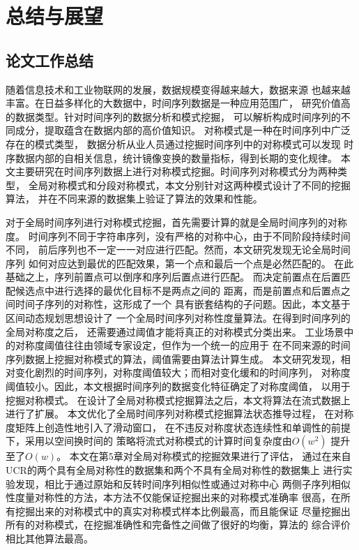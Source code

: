 
\chapter{总结与展望}
\section{论文工作总结}
随着信息技术和工业物联网的发展，数据规模变得越来越大，数据来源
也越来越丰富。在日益多样化的大数据中，时间序列数据是一种应用范围广，
研究价值高的数据类型。针对时间序列的数据分析和模式挖掘，
可以解析构成时间序列的不同成分，提取蕴含在数据内部的高价值知识。
对称模式是一种在时间序列中广泛存在的模式类型，
数据分析从业人员通过挖掘时间序列中的对称模式可以发现
时序数据内部的自相关信息，统计镜像变换的数量指标，得到长期的变化规律。
本文主要研究在时间序列数据上进行对称模式挖掘。时间序列对称模式分为两种类型，
全局对称模式和分段对称模式，本文分别针对这两种模式设计了不同的挖掘算法，
并在不同来源的数据集上验证了算法的效果和性能。

对于全局时间序列进行对称模式挖掘，首先需要计算的就是全局时间序列的对称度。
时间序列不同于字符串序列，没有严格的对称中心，由于不同阶段持续时间不同，
前后序列也不一定一一对应进行匹配。然而，本文研究发现无论全局时间序列
如何对应达到最优的匹配效果，第一个点和最后一个点是必然匹配的。
在此基础之上，序列前置点可以倒序和序列后置点进行匹配。
而决定前置点在后置匹配候选点中进行选择的最优化目标不是两点之间的
距离，而是前置点和后置点之间时间子序列的对称性，这形成了一个
具有嵌套结构的子问题。因此，本文基于区间动态规划思想设计了
一个全局时间序列对称性度量算法。在得到时间序列的全局对称度之后，
还需要通过阈值才能将真正的对称模式分类出来。
工业场景中的对称度阈值往往由领域专家设定，但作为一个统一的应用于
在不同来源的时间序列数据上挖掘对称模式的算法，阈值需要由算法计算生成。
本文研究发现，相对变化剧烈的时间序列，对称度阈值较大；而相对变化缓和的时间序列，
对称度阈值较小。因此，本文根据时间序列的数据变化特征确定了对称度阈值，
以用于挖掘对称模式。
在设计了全局对称模式挖掘算法之后，本文将算法在流式数据上进行了扩展。
本文优化了全局时间序列对称模式挖掘算法状态推导过程，
在对称度矩阵上创造性地引入了滑动窗口，
在不违反对称度状态连续性和单调性的前提下，采用以空间换时间的
策略将流式对称模式的计算时间复杂度由$O\left(w^2\right)$
提升至了$O\left(w\right)$。
本文在第5章对全局对称模式的挖掘效果进行了评估，
通过在来自UCR的两个具有全局对称性的数据集和两个不具有全局对称性的数据集上
进行实验发现，相比于通过原始和反转时间序列相似性或通过对称中心
两侧子序列相似性度量对称性的方法，本方法不仅能保证挖掘出来的对称模式准确率
很高，在所有挖掘出来的对称模式中的真实对称模式样本比例最高，而且能保证
尽量挖掘出所有的对称模式，在挖掘准确性和完备性之间做了很好的均衡，算法的
综合评价相比其他算法最高。

